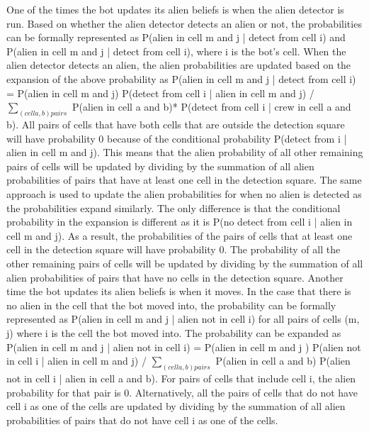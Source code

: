 \documentclass[11pt]{article}
\begin{document}
One of the times the bot updates its alien beliefs is when the alien detector is run. Based on whether the alien detector detects an alien or not, the probabilities can be formally represented as P(alien in cell m and j | detect from cell i) and P(alien in cell m and j | detect from cell i), where i is the bot's cell. When the alien detector detects an alien, the alien probabilities are updated based on the expansion of the above probability as P(alien in cell m and j | detect from cell i) = P(alien in cell m and j) P(detect from cell i | alien in cell m and j) / $\sum_{(cell a, b) pairs}$ P(alien in cell a and b)* P(detect from cell i | crew in cell a and b). All pairs of cells that have both cells that are outside the detection square will have probability 0 because of the conditional probability P(detect from i | alien in cell m and j). This means that the alien probability of all other remaining pairs of cells will be updated by dividing by the summation of all alien probabilities of pairs that have at least one cell in the detection square. The same approach is used to update the alien probabilities for when no alien is detected as the probabilities expand similarly. The only difference is that the conditional probability in the expansion is different as it is P(no detect from cell i | alien in cell m and j). As a result, the probabilities of the pairs of cells that at least one cell in the detection square will have probability 0. The probability of all the other remaining pairs of cells will be updated by dividing by the summation of all alien probabilities of pairs that have no cells in the detection square. 
\medskip
Another time the bot updates its alien beliefs is when it moves. In the case that there is no alien in the cell that the bot moved into, the probability can be formally represented as P(alien in cell m and j | alien not in cell i) for all pairs of cells (m, j) where i is the cell the bot moved into. The probability can be expanded as P(alien in cell m and j | alien not in cell i) = P(alien in cell m and j ) P(alien not in cell i | alien in cell m and j) / $\sum_{(cell a, b) pairs}$ P(alien in cell a and b) P(alien not in cell i | alien in cell a and b). For pairs of cells that include cell i, the alien probability for that pair is 0. Alternatively, all the pairs of cells that do not have cell i as one of the cells are updated by dividing by the summation of all alien probabilities of pairs that do not have cell i as one of the cells.
\medskip
\end{document}
